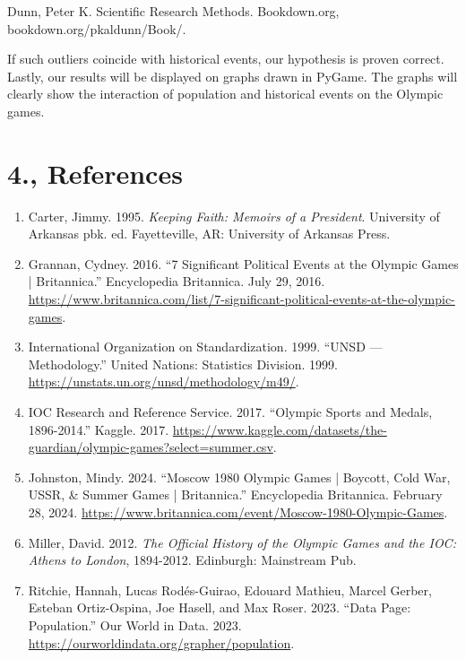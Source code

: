\documentclass[fontsize=11pt]{article}
\begin{document}
Dunn, Peter K. Scientific Research Methods. Bookdown.org, bookdown.org/pkaldunn/Book/. 

If such outliers coincide with historical events, our hypothesis is proven correct. Lastly, our results will be displayed on graphs drawn in PyGame. The graphs will clearly show the interaction of population and historical events on the Olympic games.

\section*{4., References}

\begin{enumerate}
    \item Carter, Jimmy. 1995. \textit{Keeping Faith: Memoirs of a President}. University of Arkansas pbk. ed. Fayetteville, AR: University of Arkansas Press.
    \item Grannan, Cydney. 2016. “7 Significant Political Events at the Olympic Games | Britannica.” Encyclopedia Britannica. July 29, 2016.  \url{https://www.britannica.com/list/7-significant-political-events-at-the-olympic-games}.
    \item International Organization on Standardization. 1999. “UNSD — Methodology.” United Nations: Statistics Division. 1999. \url{https://unstats.un.org/unsd/methodology/m49/}.
    \item IOC Research and Reference Service. 2017. “Olympic Sports and Medals, 1896-2014.” Kaggle. 2017. \url{https://www.kaggle.com/datasets/the-guardian/olympic-games?select=summer.csv}.
    \item Johnston, Mindy. 2024. “Moscow 1980 Olympic Games | Boycott, Cold War, USSR, \& Summer Games | Britannica.” Encyclopedia Britannica. February 28, 2024. \url{https://www.britannica.com/event/Moscow-1980-Olympic-Games}.
    \item Miller, David. 2012. \textit{The Official History of the Olympic Games and the IOC: Athens to London}, 1894-2012. Edinburgh: Mainstream Pub.
    \item Ritchie, Hannah, Lucas Rodés-Guirao, Edouard Mathieu, Marcel Gerber, Esteban Ortiz-Ospina, Joe Hasell, and Max Roser. 2023. “Data Page: Population.” Our World in Data. 2023. \url{https://ourworldindata.org/grapher/population}.
\end{enumerate}
\end{document}
